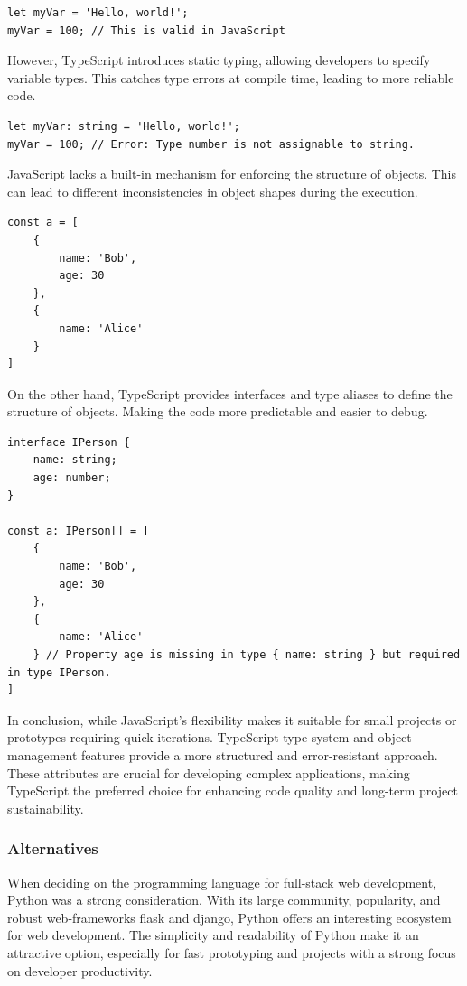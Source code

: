 \medskip
\begin{lstlisting}[caption=JavaScript dynamic typing example]
let myVar = 'Hello, world!';
myVar = 100; // This is valid in JavaScript
\end{lstlisting}

However, TypeScript introduces static typing, allowing developers to specify variable types. This catches type errors at compile time, leading to more reliable code.
\medskip
\begin{lstlisting}[caption=TypeScript static typing example]
let myVar: string = 'Hello, world!';
myVar = 100; // Error: Type number is not assignable to string.
\end{lstlisting}

JavaScript lacks a built-in mechanism for enforcing the structure of objects. This can lead to different inconsistencies in object shapes during the execution.

\medskip
\begin{lstlisting}[caption=JavaScript different object shapes]
const a = [
    { 
        name: 'Bob', 
        age: 30 
    }, 
    { 
        name: 'Alice' 
    }
]
\end{lstlisting}

On the other hand, TypeScript provides interfaces and type aliases to define the structure of objects.
Making the code more predictable and easier to debug.

\medskip
\begin{lstlisting}[caption=TypeScript enforcing object shape]
interface IPerson {
    name: string;
    age: number;
}

const a: IPerson[] = [
    { 
        name: 'Bob', 
        age: 30 
    }, 
    { 
        name: 'Alice' 
    } // Property age is missing in type { name: string } but required in type IPerson.
]
\end{lstlisting}

% 

In conclusion, while JavaScript's flexibility makes it suitable for small projects or prototypes requiring quick iterations.
TypeScript type system and object management features provide a more structured and error-resistant approach.
These attributes are crucial for developing complex applications, making TypeScript the preferred choice for enhancing code quality and long-term project sustainability.

\subsubsection{Alternatives}
When deciding on the programming language for full-stack web development, Python was a strong consideration.
With its large community, popularity, and robust web-frameworks \gls{flask} and \gls{django}, Python offers an interesting ecosystem for web development.
The simplicity and readability of Python make it an attractive option, especially for fast prototyping and projects with a strong focus on developer productivity.


